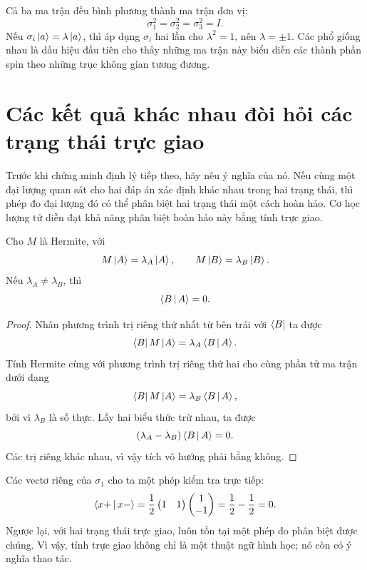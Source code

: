Cả ba ma trận đều bình phương thành ma trận đơn vị:
\begin{equation}
  \sigma_1^2=\sigma_2^2=\sigma_3^2=I.
  \label{eq:l03-pauli-squares}
\end{equation}
Nếu \(\sigma_i\left\lvert a\right\rangle=\lambda\left\lvert a\right\rangle\), thì áp dụng \(\sigma_i\) hai lần cho \(\lambda^2=1\), nên \(\lambda=\pm1\). Các phổ giống nhau là dấu hiệu đầu tiên cho thấy những ma trận này biểu diễn các thành phần spin theo những trục không gian tương đương.

\section{Các kết quả khác nhau đòi hỏi các trạng thái trực giao}

Trước khi chứng minh định lý tiếp theo, hãy nêu ý nghĩa của nó. Nếu cùng một đại lượng quan sát cho hai đáp án xác định khác nhau trong hai trạng thái, thì phép đo đại lượng đó có thể phân biệt hai trạng thái một cách hoàn hảo. Cơ học lượng tử diễn đạt khả năng phân biệt hoàn hảo này bằng tính trực giao.

\begin{theorem}
Cho \(M\) là Hermite, với
\begin{equation}
  M\left\lvert A\right\rangle=\lambda_A\left\lvert A\right\rangle,
  \qquad
  M\left\lvert B\right\rangle=\lambda_B\left\lvert B\right\rangle.
\end{equation}
Nếu \(\lambda_A\ne\lambda_B\), thì
\begin{equation}
  \left\langle B\,\middle|\,A\right\rangle=0.
\end{equation}
\end{theorem}

\begin{proof}
Nhân phương trình trị riêng thứ nhất từ bên trái với \(\left\langle B\right\rvert\) ta được
\begin{equation}
  \left\langle B\right\rvert M\left\lvert A\right\rangle=\lambda_A\left\langle B\,\middle|\,A\right\rangle.
\end{equation}
Tính Hermite cùng với phương trình trị riêng thứ hai cho cùng phần tử ma trận dưới dạng
\begin{equation}
  \left\langle B\right\rvert M\left\lvert A\right\rangle=\lambda_B\left\langle B\,\middle|\,A\right\rangle,
\end{equation}
bởi vì \(\lambda_B\) là số thực. Lấy hai biểu thức trừ nhau, ta được
\begin{equation}
  (\lambda_A-\lambda_B)\left\langle B\,\middle|\,A\right\rangle=0.
\end{equation}
Các trị riêng khác nhau, vì vậy tích vô hướng phải bằng không.
\end{proof}

Các vectơ riêng của \(\sigma_1\) cho ta một phép kiểm tra trực tiếp:
\begin{equation}
  \left\langle x+\,\middle|\,x-\right\rangle
  =
  \frac12
  \begin{pmatrix}1&1\end{pmatrix}
  \begin{pmatrix}1\\-1\end{pmatrix}
  =\frac12-\frac12=0.
\end{equation}
Ngược lại, với hai trạng thái trực giao, luôn tồn tại một phép đo phân biệt được chúng. Vì vậy, tính trực giao không chỉ là một thuật ngữ hình học; nó còn có ý nghĩa thao tác.

